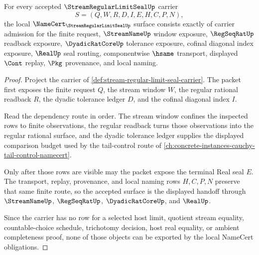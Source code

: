 \begin{theorem}
\label{thm:stream-regular-limit-seal-namecert-obligations}
For every accepted $\StreamRegularLimitSealUp$ carrier
$$
S=(Q,W,R,D,I,E,H,C,P,N),
$$
the local $\NameCert_{\StreamRegularLimitSealUp}$ surface consists exactly of carrier admission for the finite request, $\StreamNameUp$ window exposure, $\RegSeqRatUp$ readback exposure, $\DyadicRatCoreUp$ tolerance exposure, cofinal diagonal index exposure, $\RealUp$ seal routing, componentwise $\hsame$ transport, displayed $\Cont$ replay, $\Pkg$ provenance, and local naming.
\end{theorem}
\begin{proof}
Project the carrier of \autoref{def:stream-regular-limit-seal-carrier}. The packet first exposes the finite request $Q$, the stream window $W$, the regular rational readback $R$, the dyadic tolerance ledger $D$, and the cofinal diagonal index $I$.

Read the dependency route in order. The stream window confines the inspected rows to finite observations, the regular readback turns those observations into the regular rational surface, and the dyadic tolerance ledger supplies the displayed comparison budget used by the tail-control route of \autoref{ch:concrete-instances-cauchy-tail-control-namecert}.

Only after those rows are visible may the packet expose the terminal Real seal $E$. The transport, replay, provenance, and local naming rows $H,C,P,N$ preserve that same finite route, so the accepted surface is the displayed handoff through $\StreamNameUp$, $\RegSeqRatUp$, $\DyadicRatCoreUp$, and $\RealUp$.

Since the carrier has no row for a selected host limit, quotient stream equality, countable-choice schedule, trichotomy decision, host real equality, or ambient completeness proof, none of those objects can be exported by the local NameCert obligations.
\end{proof}

